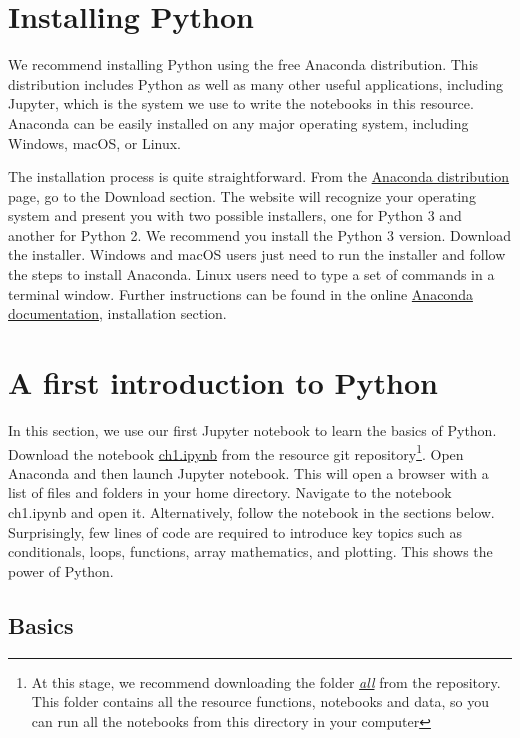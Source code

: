 \documentclass[a4paper , 12pt]{book}
\begin{document}
\section{Installing Python}

We recommend installing Python using the free Anaconda distribution. This distribution includes Python as well as many other useful applications, including Jupyter, which is the system we use to write the notebooks in this resource. Anaconda can be easily installed on any major operating system, including Windows, macOS, or Linux.

The installation process is quite straightforward. From the \href {https://www.anaconda.com/distribution/}{Anaconda distribution} page, go to the Download section. The website will recognize your operating system and present you with two possible installers, one for Python 3 and another for Python 2. We recommend you install the Python 3 version. Download the installer. Windows and macOS users just need to run the installer and follow the steps to install Anaconda. Linux users need to type a set of commands in a terminal window. Further instructions can be found in the online \href {https://docs.anaconda.com/anaconda/} {Anaconda documentation}, installation section.

\section{A first introduction to Python}

In this section, we use our first Jupyter notebook to learn the basics of Python. Download the notebook \href{http://github.com}{ch1.ipynb} from the resource git repository\footnote{At this stage, we recommend downloading the folder \href{http://github.com}{\textit{all}} from the repository. This folder contains all the resource functions, notebooks and data, so you can run all the notebooks from this directory in your computer}. Open Anaconda and then launch Jupyter notebook. This will open a browser with a list of files and folders in your home directory. Navigate to the notebook ch1.ipynb and open it. Alternatively, follow the notebook in the sections below. Surprisingly, few lines of code are required to introduce key topics such as conditionals, loops, functions, array mathematics, and plotting. This shows the power of Python.

\subsection{Basics}
\end{document}

